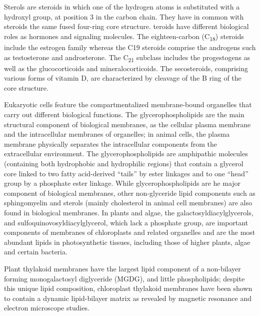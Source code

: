 Sterols are steroids in which one of the hydrogen atoms is substituted
with a hydroxyl group, at position 3 in the carbon chain. They have in
common with steroids the same fused four-ring core structure. teroids
have different biological roles as hormones and signaling molecules. The
eighteen-carbon (C\textsubscript{18}) steroids include the estrogen
family whereas the C19 steroids comprise the androgens such as
testosterone and androsterone. The C\textsubscript{21} subclass includes
the progestogens as well as the glucocorticoids and mineralocorticoids.
The secosteroids, comprising various forms of vitamin D, are
characterized by cleavage of the B ring of the core structure.

Eukaryotic cells feature the compartmentalized membrane-bound organelles
that carry out different biological functions. The glycerophospholipids
are the main structural component of biological membranes, as the
cellular plasma membrane and the intracellular membranes of organelles;
in animal cells, the plasma membrane physically separates the
intracellular components from the extracellular environment. The
glycerophospholipids are amphipathic molecules (containing both
hydrophobic and hydrophilic regions) that contain a glycerol core linked
to two fatty acid-derived ``tails'' by ester linkages and to one
``head'' group by a phosphate ester linkage. While glycerophospholipids
are he major component of biological membranes, other non-glyceride
lipid components such as sphingomyelin and sterols (mainly cholesterol
in animal cell membranes) are also found in biological membranes. In
plants and algae, the galactosyldiacylglycerols, and
sulfoquinovosyldiacylglycerol, which lack a phosphate group, are
important components of membranes of chloroplasts and related organelles
and are the most abundant lipids in photosynthetic tissues, including
those of higher plants, algae and certain bacteria.

Plant thylakoid membranes have the largest lipid component of a
non-bilayer forming monogalactosyl diglyceride (MGDG), and little
phospholipids; despite this unique lipid composition, chloroplast
thylakoid membranes have been shown to contain a dynamic lipid-bilayer
matrix as revealed by magnetic resonance and electron microscope
studies.

